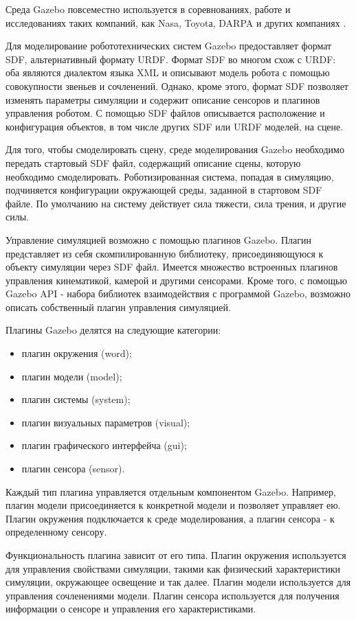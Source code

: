 \documentclass[oneside,final,14pt]{extreport}
\begin{document}
Среда Gazebo повсеместно используется в соревнованиях, работе и исследованиях таких компаний, как Nasa, Toyotа, DARPA и других компаниях \cite{gazebosim.org}. 

Для моделирование робототехнических систем Gazebo предоставляет формат SDF, альтернативный формату URDF. Формат SDF во многом схож с URDF: оба  являются диалектом языка XML и описывают модель робота с помощью  совокупности звеньев и сочленений. Однако, кроме этого, формат SDF позволяет изменять параметры симуляции и содержит описание сенсоров и плагинов управления роботом. С помощью SDF файлов описывается расположение и конфигурация объектов, в том числе других SDF или URDF моделей, на сцене. 

Для того, чтобы смоделировать сцену, среде моделирования Gazebo необходимо передать стартовый SDF файл, содержащий описание сцены, которую необходимо смоделировать. Роботизированная система, попадая в симуляцию, подчиняется конфигурации окружающей среды, заданной в стартовом SDF файле. По умолчанию на систему действует сила тяжести, сила трения, и другие силы. 

Управление симуляцией возможно с помощью плагинов Gazebo. Плагин представляет из себя скомпилированную библиотеку, присоединяющуюся к объекту симуляции через SDF файл. Имеется множество встроенных плагинов управления кинематикой, камерой и другими сенсорами. Кроме того, с помощью Gazebo API - набора библиотек взаимодействия с программой Gazebo, возможно описать собственный плагин управления симуляцией. 

Плагины Gazebo делятся на следующие категории:
\begin{itemize}
\item плагин окружения (word);
\item плагин модели (model);
\item плагин системы (system);
\item плагин визуальных параметров (visual);
\item плагин графического интерфейча (gui);
\item плагин сенсора (sensor).
\end{itemize}

Каждый тип плагина управляется отдельным компонентом Gazebo. Например, плагин модели присоединяется к конкретной модели и позволяет управляет ею. Плагин окружения подключается к среде моделирования, а плагин сенсора - к определенному сенсору. 

Функциональность плагина зависит от его типа. Плагин окружения используется для управления свойствами симуляции, такими как физический характеристики симуляции, окружающее освещение и так далее. Плагин модели используется для управления сочленениями модели. Плагин сенсора используется для получения информации о сенсоре и управления его характеристиками.
\end{document}
